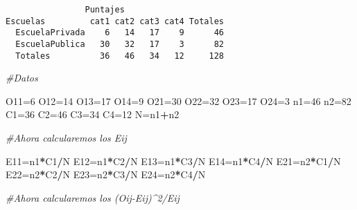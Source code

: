 \documentclass[
  a4paper,
  oneside,
  openany]{book}
\newenvironment{Shaded}{\begin{snugshade}}{\end{snugshade}}
\newcommand{\CommentTok}[1]{\textcolor[rgb]{0.56,0.35,0.01}{\textit{#1}}}
\newcommand{\DecValTok}[1]{\textcolor[rgb]{0.00,0.00,0.81}{#1}}
\newcommand{\NormalTok}[1]{#1}
\newcommand{\OtherTok}[1]{\textcolor[rgb]{0.56,0.35,0.01}{#1}}
\newcommand{\SpecialCharTok}[1]{\textcolor[rgb]{0.81,0.36,0.00}{\textbf{#1}}}
\begin{document}
\begin{verbatim}
                Puntajes
Escuelas         cat1 cat2 cat3 cat4 Totales
  EscuelaPrivada    6   14   17    9      46
  EscuelaPublica   30   32   17    3      82
  Totales          36   46   34   12     128
\end{verbatim}

\begin{Shaded}
\begin{Highlighting}[]
\CommentTok{\#Datos}

\NormalTok{O11}\OtherTok{=}\DecValTok{6}
\NormalTok{O12}\OtherTok{=}\DecValTok{14}
\NormalTok{O13}\OtherTok{=}\DecValTok{17}
\NormalTok{O14}\OtherTok{=}\DecValTok{9}
\NormalTok{O21}\OtherTok{=}\DecValTok{30}
\NormalTok{O22}\OtherTok{=}\DecValTok{32}
\NormalTok{O23}\OtherTok{=}\DecValTok{17}
\NormalTok{O24}\OtherTok{=}\DecValTok{3}
\NormalTok{n1}\OtherTok{=}\DecValTok{46}
\NormalTok{n2}\OtherTok{=}\DecValTok{82}
\NormalTok{C1}\OtherTok{=}\DecValTok{36}
\NormalTok{C2}\OtherTok{=}\DecValTok{46}
\NormalTok{C3}\OtherTok{=}\DecValTok{34}
\NormalTok{C4}\OtherTok{=}\DecValTok{12}
\NormalTok{N}\OtherTok{=}\NormalTok{n1}\SpecialCharTok{+}\NormalTok{n2}

\CommentTok{\#Ahora calcularemos los Eij}

\NormalTok{E11}\OtherTok{=}\NormalTok{n1}\SpecialCharTok{*}\NormalTok{C1}\SpecialCharTok{/}\NormalTok{N}
\NormalTok{E12}\OtherTok{=}\NormalTok{n1}\SpecialCharTok{*}\NormalTok{C2}\SpecialCharTok{/}\NormalTok{N}
\NormalTok{E13}\OtherTok{=}\NormalTok{n1}\SpecialCharTok{*}\NormalTok{C3}\SpecialCharTok{/}\NormalTok{N}
\NormalTok{E14}\OtherTok{=}\NormalTok{n1}\SpecialCharTok{*}\NormalTok{C4}\SpecialCharTok{/}\NormalTok{N}
\NormalTok{E21}\OtherTok{=}\NormalTok{n2}\SpecialCharTok{*}\NormalTok{C1}\SpecialCharTok{/}\NormalTok{N}
\NormalTok{E22}\OtherTok{=}\NormalTok{n2}\SpecialCharTok{*}\NormalTok{C2}\SpecialCharTok{/}\NormalTok{N}
\NormalTok{E23}\OtherTok{=}\NormalTok{n2}\SpecialCharTok{*}\NormalTok{C3}\SpecialCharTok{/}\NormalTok{N}
\NormalTok{E24}\OtherTok{=}\NormalTok{n2}\SpecialCharTok{*}\NormalTok{C4}\SpecialCharTok{/}\NormalTok{N}

\CommentTok{\#Ahora calcularemos los (Oij{-}Eij)\^{}2/Eij}


\end{Highlighting}
\end{Shaded}
\end{document}
